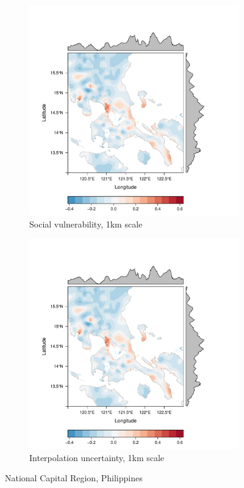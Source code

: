 \documentclass[draft]{article}
\begin{document}
\begin{figure}
  \centering
  \begin{subfigure}[b]{0.3\textwidth}
    \includegraphics[width=\textwidth]{sviNCR.pdf}
    \caption{Social vulnerability, 1km scale}
    \label{fig:sviNCR}
  \end{subfigure}
  \begin{subfigure}[b]{0.3\textwidth}
    \includegraphics[width=\textwidth]{sviNCR.pdf}
    \caption{Interpolation uncertainty, 1km scale}
    \label{fig:varNCR}
  \end{subfigure}
  \caption{National Capital Region, Philippines}
\end{figure}
\end{document}
